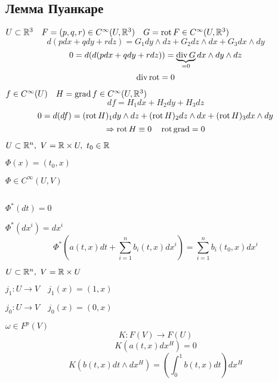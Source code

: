     \subsection*{Лемма Пуанкаре}

    \begin{example}
        $U \subset \mathbb{R}^3 \quad F = (p, q, r) \in C^\infty(U, \mathbb{R}^3) \quad G = \operatorname{rot} F \in C^\infty (U, \mathbb{R}^3)$
        \[
            d(pdx + qdy + rdz) = G_1 dy \wedge dz + G_2 dz \wedge dx + G_3 dx \wedge dy    
        \]
        \[
            0 = d(d(pdx + qdy + rdz)) = \underbrace{\operatorname{div} G}_{=0} dx \wedge dy \wedge dz    
        \]
        \[
            \operatorname{div} \operatorname{rot} = 0    
        \]
    \end{example}
    \begin{example}
        $f \in C^\infty(U) \quad H = \operatorname{grad} f \in C^\infty (U, \mathbb{R}^3)$
        \[
            df = H_1 dx + H_2 dy + H_3 dz    
        \]
        \[
            0 = d(df) = (\operatorname{rot} H)_1 dy \wedge dz + (\operatorname{rot} H)_2 dz \wedge dx + (\operatorname{rot} H)_3 dx \wedge dy   
        \]
        \[
            \Rightarrow \operatorname{rot} H \equiv 0 \quad \operatorname{rot} \operatorname{grad} = 0    
        \]
    \end{example}
    \begin{example} %
        $U \subset \mathbb{R}^n, \ V = \mathbb{R} \times U, \ t_0 \in \mathbb{R}$
        \par $\Phi(x) = (t_0, x)$
        \par $\Phi \in C^\infty (U, V)$
        \par $ $
        \par $\Phi^*(dt) = 0$
        \par $\Phi^*(dx^i) = dx^i$
        \[
            \Phi^*(a(t, x)dt + \sum_{i=1}^n b_i(t, x)dx^i) = \sum_{i=1}^n b_i(t_0, x) dx^i   
        \]
        \par $U \subset \mathbb{R}^n, \ V = \mathbb{R} \times U$
        \par $j_1 : U \rightarrow V \quad j_1(x) = (1, x)$
        \par $j_0 : U \rightarrow V \quad j_0(x) = (0, x)$
        \par $\omega \in F^p(V)$
        \[
            K : F(V) \rightarrow F(U)    
        \]
        \[
            K(a(t, x) dx^H) = 0    
        \]
        \[
            K(b(t, x)dt \wedge dx^H) = \left( \int_0^1 b(t, x)dt \right) dx^H    
        \]  
    \end{example}

